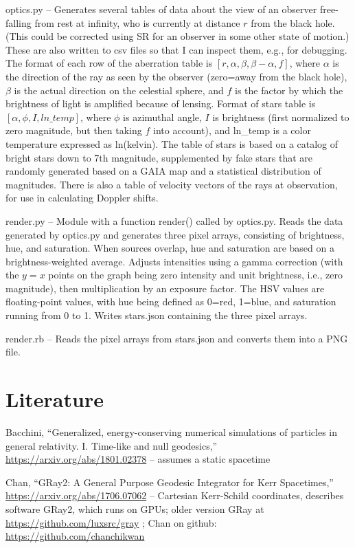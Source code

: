 \documentclass{article}
\begin{document}
optics.py -- Generates several tables of data about the view of an observer free-falling from rest at infinity,
who is currently at distance $r$ from the black hole.
(This could be corrected using SR for an observer in some other state of motion.) These are also
written to csv files so that I can inspect them, e.g., for debugging.
The format of
each row of the aberration table is $[r,\alpha,\beta,\beta-\alpha,f]$, where $\alpha$ is the direction
of the ray as seen by the observer (zero=away from the black hole), $\beta$ is the actual direction
on the celestial sphere, and $f$ is the factor by which the brightness of light is amplified because
of lensing. Format of stars table is $[\alpha,\phi,I,ln\_temp]$, where $\phi$ is azimuthal angle, $I$ is
brightness (first normalized to zero magnitude, but then taking $f$ into account), and ln\_temp is
a color temperature expressed as ln(kelvin).
The table of stars is based on a catalog of bright stars down to 7th magnitude, supplemented by
fake stars that are randomly generated based on a GAIA map and a statistical distribution of
magnitudes. There is also a table of velocity vectors of the rays at observation, for use in
calculating Doppler shifts.

render.py -- Module with a function render() called by optics.py.
Reads the data generated by optics.py and generates three pixel arrays, consisting of
brightness, hue, and saturation. When sources overlap, hue and saturation are based on a brightness-weighted
average. Adjusts intensities using a gamma correction (with the $y=x$ points on the graph being
zero intensity and unit brightness, i.e., zero magnitude), then multiplication by an exposure factor.
The HSV values are floating-point values, with hue being defined as 0=red, 1=blue,
and saturation running from 0 to 1. Writes stars.json containing the three pixel arrays.

render.rb -- Reads the pixel arrays from stars.json and converts them into a PNG file.

\section{Literature}

Bacchini, ``Generalized, energy-conserving numerical simulations of particles
in general relativity. I. Time-like and null geodesics,''
\url{https://arxiv.org/abs/1801.02378} -- assumes a static spacetime

Chan, ``GRay2: A General Purpose Geodesic Integrator for Kerr Spacetimes,''
\url{https://arxiv.org/abs/1706.07062} --
Cartesian Kerr-Schild coordinates, describes software GRay2, which runs on GPUs;
older version GRay at \url{https://github.com/luxsrc/gray} ; Chan on github:
\url{https://github.com/chanchikwan}
\end{document}
